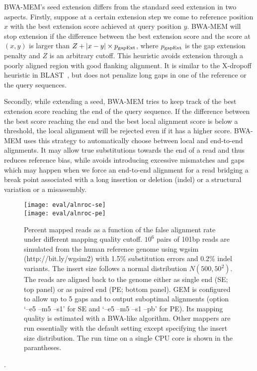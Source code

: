 \documentclass{bioinfo}
\begin{document}
\begin{methods}
BWA-MEM's seed extension differs from the standard seed extension in two
aspects. Firstly, suppose at a certain extension step we come to reference
position $x$ with the best extension score achieved at query position $y$.
BWA-MEM will stop extension if the difference between the best extension score
and the score at $(x,y)$ is larger than $Z+|x-y|\times p_{\rm gapExt}$, where
$p_{\rm gapExt}$ is the gap extension penalty and $Z$ is an arbitrary cutoff.
This heuristic avoids extension through a poorly aligned region with good
flanking alignment. It is similar to the X-dropoff heuristic in
BLAST~\citep{Altschul:1997vn}, but does not penalize long gaps in one of the
reference or the query sequences.

Secondly, while extending a seed, BWA-MEM tries to keep track of the best
extension score reaching the end of the query sequence. If the difference
between the best score reaching the end and the best local alignment score is
below a threshold, the local alignment will be rejected even if it has a higher
score. BWA-MEM uses this strategy to automatically choose between local and
end-to-end alignments. It may allow true substitutions towards the end of a
read and thus reduces reference bias, while avoids introducing excessive
mismatches and gaps which may happen when we force an end-to-end alignment for
a read bridging a break point associated with a long insertion or deletion
(indel) or a structural variation or a misassembly.

\begin{figure}[tb]
\centering
\texttt{[image: eval/alnroc-se]}\\
\texttt{[image: eval/alnroc-pe]}
\caption{Percent mapped reads as a function of the false alignment rate under
different mapping quality cutoff. $10^6$ pairs of 101bp reads are simulated
from the human reference genome using wgsim (http://bit.ly/wgsim2) with 1.5\%
substitution errors and 0.2\% indel variants. The insert size follows a normal
distribution $N(500,50^2)$. The reads are aligned back to the genome either as
single end (SE; top panel) or as paired end (PE; bottom panel). GEM is
configured to allow up to 5 gaps and to output suboptimal alignments (option
`--e5 --m5 --s1' for SE and `--e5 --m5 --s1 --pb' for PE). Its mapping quality
is estimated with a BWA-like algorithm. Other mappers are run essentially with
the default setting except specifying the insert size distribution. The run
time on a single CPU core is shown in the parantheses.}\label{fig:eval}
\end{figure}.


\end{methods}
\end{document}
